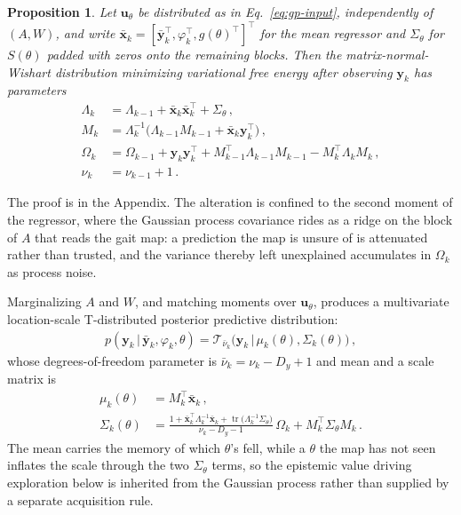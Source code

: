 \documentclass[lettersize,journal]{IEEEtran}
\newtheorem{proposition}{Proposition}
\DeclareMathOperator{\tr}{tr}
\newcommand{\given}[1][]{\,#1\vert\,}
\begin{document}
\begin{proposition} \label{prop:mnw}
Let $\mathbf{u}_{\theta}$ be distributed as in Eq.~\ref{eq:gp-input}, independently of $(A, W)$, and write $\bar{\mathbf{x}}_k = [\bar{\mathbf{y}}_k^\top, \varphi_k^\top, g(\theta)^\top]^\top$ for the mean regressor and $\Sigma_{\theta}$ for $S(\theta)$ padded with zeros onto the remaining blocks. Then the matrix-normal-Wishart distribution minimizing variational free energy after observing $\mathbf{y}_k$ has parameters
\begin{align} \label{eq:mnw-update}
    \Lambda_k &= \Lambda_{k-1} + \bar{\mathbf{x}}_k \bar{\mathbf{x}}_k^\top + \Sigma_{\theta} \, , \nonumber \\
    M_k &= \Lambda_k^{-1}\big(\Lambda_{k-1} M_{k-1} + \bar{\mathbf{x}}_k \mathbf{y}_k^\top \big) \, , \nonumber \\
    \Omega_k &= \Omega_{k-1} + \mathbf{y}_k \mathbf{y}_k^\top + M_{k-1}^\top \Lambda_{k-1} M_{k-1} - M_k^\top \Lambda_k M_k \, , \nonumber \\
    \nu_k &= \nu_{k-1} + 1 \, .
\end{align}
\end{proposition}
The proof is in the Appendix. The alteration is confined to the second moment of the regressor, where the Gaussian process covariance rides as a ridge on the block of $A$ that reads the gait map: a prediction the map is unsure of is attenuated rather than trusted, and the variance thereby left unexplained accumulates in $\Omega_k$ as process noise.

Marginalizing $A$ and $W$, and matching moments over $\mathbf{u}_{\theta}$, produces a multivariate location-scale T-distributed posterior predictive distribution:
\begin{align} \label{eq:predictive}
	p(\mathbf{y}_k \given \bar{\mathbf{y}}_k, \varphi_k, \theta) = \mathcal{T}_{\bar{\nu}_k} \big(\mathbf{y}_k \given \mu_k(\theta), \Sigma_k(\theta)\big) \, ,
\end{align}
whose degrees-of-freedom parameter is $\bar{\nu}_{k} = \nu_k  - D_y + 1$ and mean and a scale matrix is
\begin{align} \label{eq:predictive-moments}
    \mu_k(\theta) &= M_k^\top \bar{\mathbf{x}}_k \, ,  \\
    \Sigma_k(\theta) &= \frac{1 + \bar{\mathbf{x}}_k^\top \Lambda_k^{-1} \bar{\mathbf{x}}_k + \tr\big(\Lambda_k^{-1}\Sigma_{\theta}\big)}{\nu_k - D_y - 1}\,\Omega_k + M_k^\top \Sigma_{\theta} M_k \, . \nonumber
\end{align}
The mean carries the memory of which $\theta$'s fell, while a $\theta$ the map has not seen inflates the scale through the two $\Sigma_{\theta}$ terms, so the epistemic value driving exploration below is inherited from the Gaussian process rather than supplied by a separate acquisition rule.
\end{document}
